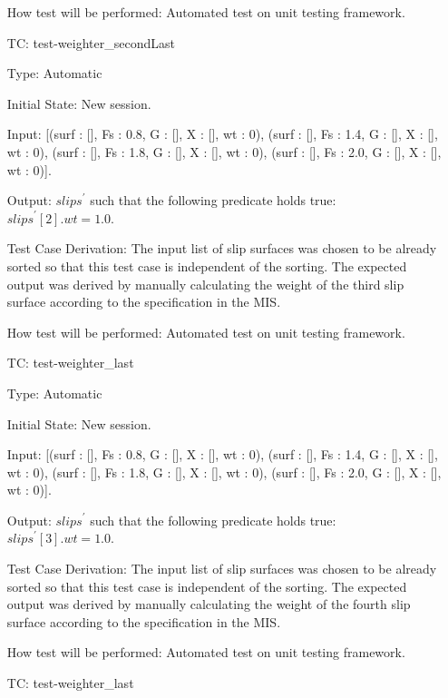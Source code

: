 \documentclass[12pt, titlepage]{article}
\newcounter{utestnum} %
\begin{document}
\begin{enumerate}[label=TC\arabic*:,ref={\arabic*}]
	How test will be performed: Automated test on unit testing framework.
	
	\item [TC\refstepcounter{utestnum}\theutestnum: 
	\label{TC_WeighterSecondLast}] 
	test-weighter\_secondLast
	
	Type: Automatic
	
	Initial State: New session.
	
	Input: [(surf : [], Fs : 0.8, G : [], X : [], wt : 0), (surf : [], Fs : 
	1.4, G : [], X : [], wt : 0), (surf : [], Fs : 1.8, G : [], X : [], wt : 
	0), (surf : [], Fs : 2.0, G : [], X : [], wt : 0)].
	
	Output: $\textit{slips}^\prime$ such that the following predicate holds 
	true:\\ 
	$\textit{slips}^\prime[2].wt = 1.0$.
	
	Test Case Derivation: The input list of slip surfaces was chosen to be 
	already 
	sorted so that this test case is independent of the sorting. The expected 
	output was derived by manually calculating the weight of the third slip 
	surface according to the specification in the MIS.
	
	How test will be performed: Automated test on unit testing framework.
	
	\item [TC\refstepcounter{utestnum}\theutestnum: \label{TC_WeighterLast}] 
	test-weighter\_last
	
	Type: Automatic
	
	Initial State: New session.
	
	Input: [(surf : [], Fs : 0.8, G : [], X : [], wt : 0), (surf : [], Fs : 
	1.4, G : [], X : [], wt : 0), (surf : [], Fs : 1.8, G : [], X : [], wt : 
	0), (surf : [], Fs : 2.0, G : [], X : [], wt : 0)].
	
	Output: $\textit{slips}^\prime$ such that the following predicate holds 
	true:\\ 
	$\textit{slips}^\prime[3].wt = 1.0$.
	
	Test Case Derivation: The input list of slip surfaces was chosen to be 
	already 
	sorted so that this test case is independent of the sorting. The expected 
	output was derived by manually calculating the weight of the fourth slip 
	surface according to the specification in the MIS.
	
	How test will be performed: Automated test on unit testing framework.
	
	\item [TC\refstepcounter{utestnum}\theutestnum: \label{TC_WeighterNaN}] 
	test-weighter\_last
	

\end{enumerate}
\end{document}
